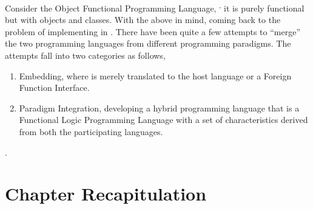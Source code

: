 \documentclass[thesis-solanki.tex]{subfiles}
\begin{document}
Consider the Object Functional Programming Language, 
\cite{website:scala}\textsuperscript{,}
it is purely functional but with objects and classes.
With the above in mind, coming back to the problem of implementing  in .
There have been quite a few attempts to ``merge'' the two programming languages from different programming
paradigms.
The attempts fall into two categories as follows,

\begin{enumerate}
\item
  Embedding, where  is merely translated to the host language  or a Foreign
  Function Interface.

\item
  Paradigm Integration, developing a hybrid programming language that is a Functional Logic Programming Language
  with a set of characteristics derived from both the participating languages.
\end{enumerate}

.  

\section{Chapter Recapitulation}

\ifMain
\begin{scope}
  \nolinenumbers
  \enotesize
  \par
  \begin{singlespace}
  \setlength{\parskip}{12pt plus 2pt minus 1pt}
  \theendnotes
  \par
  \end{singlespace}
\end{scope}
\fi
\end{document}
